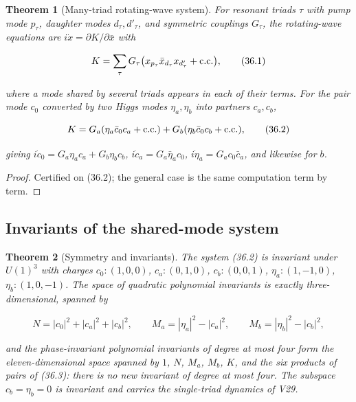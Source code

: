 \documentclass[11pt]{article}
\newtheorem{theorem}{Theorem}[section]
\theoremstyle{remark}
\begin{document}
\begin{theorem}[Many-triad rotating-wave system]
\label{thm:v20v33-hamiltonian}
For resonant triads \(\tau\) with pump mode \(p_\tau\), daughter modes
\(d_\tau,d'_\tau\), and symmetric couplings \(G_\tau\), the rotating-wave
equations are \(i\dot x=\partial K/\partial\bar x\) with

\[
 K=\sum_\tau G_\tau\bigl(x_{p_\tau}\bar x_{d_\tau}x_{d'_\tau}+\hbox{c.c.}\bigr),
                                                                    \tag{36.1}
\]

where a mode shared by several triads appears in each of their
terms.  For the pair mode \(c_0\) converted by two Higgs modes
\(\eta_a,\eta_b\) into partners \(c_a,c_b\),

\[
 K=G_a(\eta_a\bar c_0c_a+\hbox{c.c.})+G_b(\eta_b\bar c_0c_b+\hbox{c.c.}),
                                                                    \tag{36.2}
\]

giving \(i\dot c_0=G_a\eta_ac_a+G_b\eta_bc_b\), \(i\dot c_a=G_a\bar\eta_ac_0\),
\(i\dot\eta_a=G_ac_0\bar c_a\), and likewise for \(b\).
\end{theorem}

\begin{proof}
Certified on (36.2); the general case is the same computation term
by term.
\end{proof}

\subsection{Invariants of the shared-mode system}

\begin{theorem}[Symmetry and invariants]
\label{thm:v20v33-invariants}
The system (36.2) is invariant under \(U(1)^3\) with charges
\(c_0:(1,0,0)\), \(c_a:(0,1,0)\), \(c_b:(0,0,1)\), \(\eta_a:(1,-1,0)\),
\(\eta_b:(1,0,-1)\).  The space of quadratic polynomial invariants is
exactly three-dimensional, spanned by

\[
 N=|c_0|^2+|c_a|^2+|c_b|^2,\qquad M_a=|\eta_a|^2-|c_a|^2,\qquad M_b=|\eta_b|^2-|c_b|^2,
                                                                    \tag{36.3}
\]

and the phase-invariant polynomial invariants of degree at most four
form the eleven-dimensional space spanned by \(1\), \(N\), \(M_a\),
\(M_b\), \(K\), and the six products of pairs of (36.3): there is no
new invariant of degree at most four.  The subspace \(c_b=\eta_b=0\)
is invariant and carries the single-triad dynamics of V29.
\end{theorem}
\end{document}
